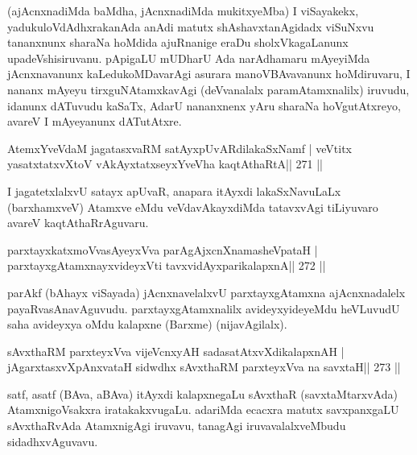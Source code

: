 \begin{artha}
(ajAcnxnadiMda baMdha, jAcnxnadiMda mukitxyeMba) I viSayakekx, yadukuloVdAdhxrakanAda anAdi matutx shAshavxtanAgidadx viSuNxvu tananxnunx sharaNa hoMdida ajuRnanige eraDu sholxVkagaLanunx upadeVshisiruvanu. pApigaLU mUDharU Ada narAdhamaru mAyeyiMda jAcnxnavanunx kaLedukoMDavarAgi asurara manoVBAvavanunx hoMdiruvaru, I nananx mAyeyu tirxguNAtamxkavAgi (deVvanalalx paramAtamxnalilx) iruvudu, idanunx dATuvudu kaSaTx, AdarU nananxnenx yAru sharaNa hoVgutAtxreyo, avareV I mAyeyanunx dATutAtxre.
\end{artha}
 

\begin{shl}
AtemxYveVdaM jagatasxvaRM satAyxpUvARdilakaSxNamf |
veVtitx yasatxtatxvXtoV vAkAyxtatxseyxYveVha kaqtAthaRtA\hfill || 271 ||
\end{shl}

\begin{artha}
I jagatetxlalxvU satayx apUvaR, anapara itAyxdi lakaSxNavuLaLx  (barxhamxveV) Atamxve eMdu veVdavAkayxdiMda tatavxvAgi tiLiyuvaro avareV kaqtAthaRrAguvaru.
\end{artha}

\begin{shl}
parxtayxkatxmoVvasAyeyxVva parAgAjxcnXnamasheVpataH |
parxtayxgAtamxnayxvideyxVti tavxvidAyxparikalapxnA\hfill || 272 ||
\end{shl}

\begin{artha}
parAkf (bAhayx viSayada) jAcnxnavelalxvU parxtayxgAtamxna  ajAcnxnadalelx payaRvasAnavAguvudu. parxtayxgAtamxnalilx avideyxyideyeMdu heVLuvudU saha avideyxya oMdu kalapxne (Barxme) (nijavAgilalx).
\end{artha}

\begin{shl}
sAvxthaRM parxteyxVva vijeVcnxyAH sadasatAtxvXdikalapxnAH |
jAgarxtasxvXpAnxvataH sidwdhx sAvxthaRM parxteyxVva na savxtaH\hfill || 273 ||
\end{shl}

\begin{artha}
satf, asatf (BAva, aBAva) itAyxdi kalapxnegaLu sAvxthaR  (savxtaMtarxvAda) AtamxnigoVsakxra iratakakxvugaLu. adariMda ecacxra  matutx savxpanxgaLU sAvxthaRvAda AtamxnigAgi iruvavu, tanagAgi iruvavalalxveMbudu sidadhxvAguvavu.
\end{artha}


